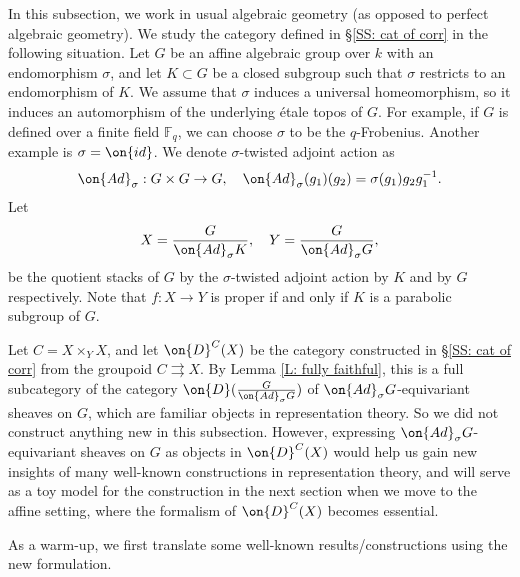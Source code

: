 \documentclass[11pt]{amsart}
\theoremstyle{definition}
\theoremstyle{definition}
\theoremstyle{definition}
\numberwithin{equation}{subsection}
\newcommand{\bF}{{\mathbb F}}
\newcommand{\Ad}{{\on{Ad}}}
\newcommand{\id}{{\on{id}}}
\begin{document}
In this subsection, we work in usual algebraic geometry (as opposed to perfect algebraic geometry). We study the category defined in \S \ref{SS: cat of corr} in the following situation. Let $G$ be an affine algebraic group over $k$ with an endomorphism $\sigma$, and let $K\subset G$ be a closed subgroup such that $\sigma$ restricts to an endomorphism of $K$. We assume that $\sigma$ induces a universal homeomorphism, so it induces an automorphism of the underlying \'etale topos of $G$. For example, if $G$ is defined over a finite field $\bF_q$, we can choose $\sigma$ to be the $q$-Frobenius. Another example is $\sigma=\id$.
We denote $\sigma$-twisted adjoint action as
\[\Ad_\sigma: G\times G\to G,\quad \Ad_\sigma(g_1)(g_2)=\sigma(g_1)g_2 g_1^{-1}.\]
Let
$$X=\frac{G}{\Ad_\sigma K},\quad Y=\frac{G}{\Ad_\sigma G},$$
be the quotient stacks of $G$ by the $\sigma$-twisted adjoint action by $K$ and by $G$ respectively.
Note that $f: X\to Y$ is proper if and only if $K$ is a parabolic subgroup of $G$. 

Let $C=X\times_YX$, and let $\on{D}^{C}(X)$ be the category constructed in \S \ref{SS: cat of corr} from the groupoid $C\rightrightarrows X$.
By Lemma \ref{L: fully faithful}, this is a full subcategory of the category $\on{D}(\frac{G}{\Ad_\sigma G})$ of $\Ad_\sigma G$-equivariant sheaves on $G$, which are familiar objects in representation theory.
So we did not construct anything new in this subsection. However, expressing $\Ad_\sigma G$-equivariant sheaves on $G$ as objects in $\on{D}^{C}(X)$ would help us gain new insights of many well-known constructions in representation theory, and will serve as a toy model for the construction in the next section when we move to the affine setting, where the formalism of $\on{D}^{C}(X)$ becomes essential.


As a warm-up, we first translate some well-known results/constructions using the new formulation.
\end{document}
